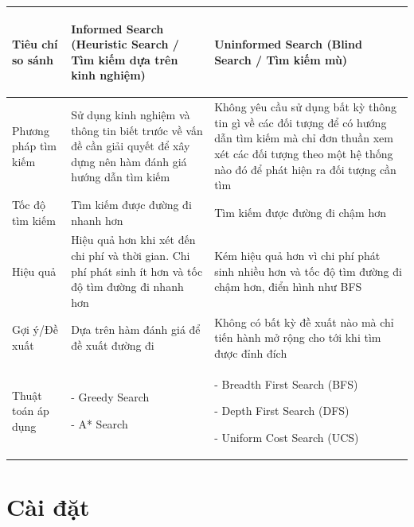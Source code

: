 \begin{center}
    \begin{tabular}{ |m{3cm}|m{6cm}|m{6cm}|}
    \hline
    \rowcolor[RGB]{229,229,229} 
    \begin{center}\textbf{Tiêu chí so sánh}\end{center} & \begin{center}\textbf{Informed Search (Heuristic Search / Tìm kiếm dựa trên kinh nghiệm)}\end{center} & \begin{center}\textbf{Uninformed Search (Blind Search / Tìm kiếm mù)}\end{center}  \\ \hline
    \centering Phương pháp tìm kiếm & Sử dụng kinh nghiệm và thông tin biết trước về vấn đề cần giải quyết để xây dựng nên hàm đánh giá hướng dẫn tìm kiếm & Không yêu cầu sử dụng bất kỳ thông tin gì về các đối tượng để có hướng dẫn tìm kiếm mà chỉ đơn thuần xem xét các đối tượng theo một hệ thống nào đó để phát hiện ra đối tượng cần tìm \\ \hline
    \centering Tốc độ tìm kiếm & Tìm kiếm được đường đi nhanh hơn & Tìm kiếm được đường đi chậm hơn  \\ \hline
    \centering Hiệu quả & Hiệu quả hơn khi xét đến chi phí và thời gian. Chi phí phát sinh ít hơn và tốc độ tìm đường đi nhanh hơn & Kém hiệu quả hơn vì chi phí phát sinh nhiều hơn và tốc độ tìm đường đi chậm hơn, điển hình như BFS \\ \hline
    \centering Gợi ý/Đề xuất & Dựa trên hàm đánh giá để đề xuất đường đi & Không có bất kỳ đề xuất nào mà chỉ tiến hành mở rộng cho tới khi tìm được đỉnh đích \\ \hline
    \centering Thuật toán áp dụng & \par
   - Greedy Search \par
   - A* Search & \par
   - Breadth First Search (BFS) \par
   - Depth First Search (DFS) \par
   - Uniform Cost Search (UCS) \\ \hline
    \end{tabular}
\end{center}

\chapter{Cài đặt}
\setcounter{figure}{0}

